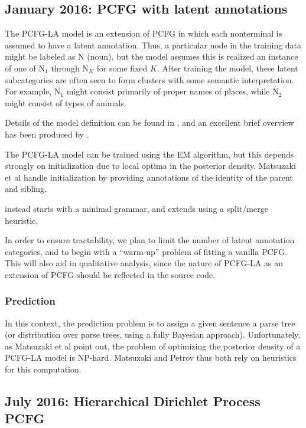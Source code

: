 \documentclass[english]{article}
\begin{document}
\subsection{January 2016: PCFG with latent annotations}

The PCFG-LA model is an extension of PCFG in which each nonterminal is assumed to have a latent annotation. Thus, a particular node in the training data might be labeled as N (noun), but the model assumes this is realized an instance of one of N$_{1}$ through N$_{K}$ for some fixed $K$. After training the model, these latent subcategories are often seen to form clusters with some semantic interpretation. For example, N$_{1}$ might consist primarily of proper names of places, while N$_{2}$ might consist of types of animals.

Details of the model definition can be found in \citet{Matsuzaki2005}, and an excellent brief overview has been produced by \citet{Manning2012}.

The PCFG-LA model can be trained using the EM algorithm, but this depends strongly on initialization due to local optima in the posterior density. Matsuzaki et al handle initialization by providing annotations of the identity of the parent and sibling. 

\citet{Petrov2006} instead starts with a minimal grammar, and extends using a split/merge heuristic.

In order to ensure tractability, we plan to limit the number of latent annotation categories, and to begin with a ``warm-up'' problem of fitting a vanilla PCFG. This will also aid in qualitative analysis, since the nature of PCFG-LA as an extension of PCFG should be reflected in the source code.

\subsubsection*{Prediction}
In this context, the prediction problem is to assign a given sentence a parse tree (or distribution over parse trees, using a fully Bayesian approach). Unfortunately, as Matsuzaki et al point out, the problem of optimizing the posterior density of a PCFG-LA model is NP-hard. Matsuzaki and Petrov thus both rely on heuristics for this computation.


\subsection{July 2016: Hierarchical Dirichlet Process PCFG}
\end{document}
